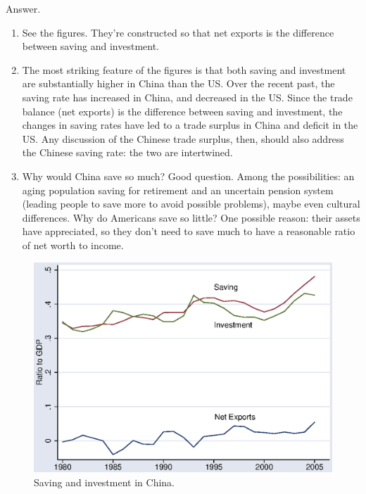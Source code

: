 \documentclass[letterpaper,12pt]{article}
\begin{document}
\begin{enumerate}
Answer.  

\begin{enumerate}
\item See the figures.  They're constructed so that net exports
is the difference between saving and investment.  

\item The most striking feature of the figures is that 
both saving and investment are substantially higher in China than the US.
Over the recent past, the saving rate has increased in China, 
and decreased in the US.
Since the trade balance (net exports) is the difference 
between saving and investment, 
the changes in saving rates have led to 
a trade surplus in China and deficit in the US.
Any discussion of the Chinese trade surplus, then, should also address the 
Chinese saving rate:  the two are intertwined.  
  
\item Why would China save so much?  
Good question.
Among the possibilities:  
an aging population saving for retirement and  
an uncertain pension system (leading people to save more to avoid possible
problems), 
maybe even cultural differences.  
Why do Americans save so little?  
One possible reason:  their assets have appreciated, so they 
don't need to save much to have a reasonable ratio of net worth 
to income.  
\end{enumerate}


\begin{figure}
    \centering
    \includegraphics[scale=0.8]{chnflows.eps}
    \caption{Saving and investment in China.}
    \label{fig:chn}%
\end{figure}


\end{enumerate}
\end{document}

